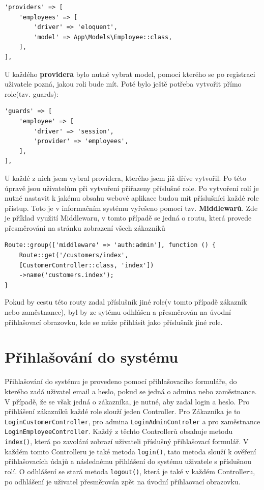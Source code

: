 \begin{verbatim}
'providers' => [
    'employees' => [
        'driver' => 'eloquent',
        'model' => App\Models\Employee::class,
    ],
],
\end{verbatim}

    
\noindent U každého \textbf{providera} bylo nutné vybrat model, pomocí kterého se po registraci uživatele pozná, jakou roli bude mít. Poté bylo ještě potřeba vytvořit přímo role(tzv. guards):

\begin{verbatim}
'guards' => [
    'employee' => [
        'driver' => 'session',
        'provider' => 'employees',
    ],
],
\end{verbatim}


 U každé z nich jsem vybral providera, kterého jsem již dříve vytvořil. Po této úpravě jsou uživatelům při vytvoření přiřazeny příslušné role. Po vytvoření rolí je nutné nastavit k jakému obsahu webové aplikace budou mít příslušníci každé role přístup. Toto je v informačním systému vyřešeno pomocí tzv. \textbf{Middlewarů}. 
 Zde je příklad využití Middlewaru, v tomto případě se jedná o routu, která provede přesměrování na stránku zobrazení všech zákazníků

\begin{verbatim}
Route::group(['middleware' => 'auth:admin'], function () {
    Route::get('/customers/index',
    [CustomerController::class, 'index'])
    ->name('customers.index');
}
\end{verbatim}



Pokud by cestu této routy zadal příslušník jiné role(v tomto případě zákazník nebo zaměstnanec), byl by ze sytému odhlášen a přesměrován na úvodní přihlašovací obrazovku, kde se může přihlásit jako příslušník jiné role.


\section{Přihlašování do systému}

Přihlašování do systému je provedeno pomocí přihlašovacího formuláře, do kterého zadá uživatel email a heslo, pokud se jedná o admina nebo zaměstnance. V případě, že se však jedná o zákazníka, je nutné, aby zadal login a heslo. Pro přihlášení zákazníků každé role slouží jeden Controller. Pro Zákazníka je to \texttt{LoginCustomerController}, pro admina \texttt{LoginAdminControler} a pro zaměstnance \texttt{LoginEmployeeController}. Každý z těchto Controllerů obsahuje metodu \texttt{index()}, která po zavolání zobrazí uživateli příslušný přihlašovací formulář. V každém tomto Controlleru je také metoda \texttt{login()}, tato metoda slouží k ověření přihlašovacích údajů a následnému přihlášení do systému uživatele s příslušnou rolí. O odhlášení se stará metoda \texttt{logout()}, která je také v každém Controlleru, po odhlášení je uživatel přesměrován zpět na úvodní přihlaovací obrazovku.


